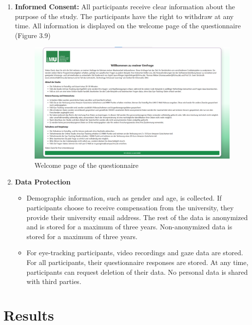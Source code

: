 \begin{enumerate}
    \item \textbf{Informed Consent: }All participants receive clear information about the purpose of the study. The participants have the right to withdraw at any time. All information is displayed on the welcome page of the questionnaire (Figure 3.9)

\begin{figure} [H]
  \centering
  \includegraphics[scale=0.45]{figures/welcome_page.png}
  \caption{Welcome page of the questionnaire }
  \label{fig:AnhangsChor}
\end{figure}

    
    \item \textbf{Data Protection}
    \begin{itemize}
        \item Demographic information, such as gender and age, is collected. If participants choose to receive compensation from the university, they provide their university email address. The rest of the data is anonymized and is stored for a maximum of three years. Non-anonymized data is stored for a maximum of three years.
        \item  For eye-tracking participants, video recordings and gaze data are stored. For all participants, their questionnaire responses are stored. At any time, participants can request deletion of their data. No personal data is shared with third parties.
    \end{itemize}
\end{enumerate}

\chapter{Results}

